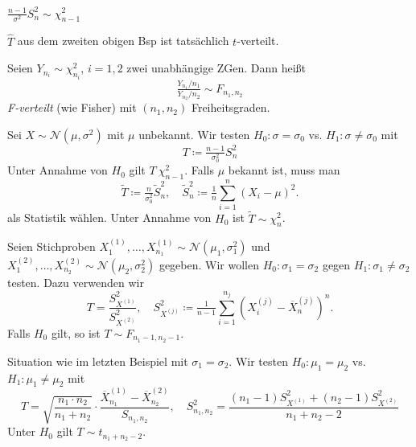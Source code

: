 \documentclass{cheat-sheet}
\newcommand{\Normal}{\mathcal{N}} %
\begin{document}
\begin{lem}
  $\tfrac{n-1}{\sigma^2} S_n^2 \sim \chi_{n-1}^2$
\end{lem}

\begin{kor}
  $\hat{T}$ aus dem zweiten obigen Bsp ist tatsächlich $t$-verteilt.
\end{kor}

\begin{defn}
  Seien $Y_{n_i} \sim \chi_{n_i}^2$, $i = 1, 2$ zwei unabhängige ZGen.
  Dann heißt %
  \[ \tfrac{Y_{n_1} / n_1}{Y_{n_2} / n_2} \sim F_{n_1, n_2} \]
  \emph{F-verteilt} (wie Fisher) mit $(n_1, n_2)$ Freiheitsgraden.
\end{defn}


\begin{bsp}
  Sei $X \sim \Normal(\mu, \sigma^2)$ mit $\mu$ unbekannt.
  Wir testen $H_0 : \sigma = \sigma_0$ vs. $H_1 : \sigma \neq \sigma_0$ mit
  \[ T \coloneqq \tfrac{n-1}{\sigma_0^2} S_n^2 \]
  Unter Annahme von $H_0$ gilt $T ~ \chi_{n-1}^2$.
  Falls $\mu$ bekannt ist, muss man
  \[
    \widetilde{T} \coloneqq \tfrac{n}{\sigma_0^2} \widetilde{S}_n^2, \quad
    \widetilde{S}_n^2 \coloneqq \tfrac{1}{n} \sum_{i=1}^n (X_i - \mu)^2.
  \]
  als Statistik wählen. Unter Annahme von $H_0$ ist $\widetilde{T} \sim \chi_n^2$.
\end{bsp}

\begin{bsp}
  Seien Stichproben $X_1^{(1)}, \ldots, X_{n_1}^{(1)} \sim \Normal(\mu_1, \sigma_1^2)$ und $X_1^{(2)}, \ldots, X_{n_2}^{(2)} \sim \Normal(\mu_2, \sigma_2^2)$ gegeben.
  Wir wollen $H_0 : \sigma_1 = \sigma_2$ gegen $H_1 : \sigma_1 \neq \sigma_2$ testen.
  Dazu verwenden wir
  \[
    T = \frac{S_{X^{(1)}}^2}{S_{X^{(2)}}^2}, \quad
    S_{X^{(j)}}^2 \coloneqq \tfrac{1}{n-1} \sum_{i=1}^{n_j} \left( X_i^{(j)} - \overline{X}^{(j)}_n \right)^n.
  \]
  Falls $H_0$ gilt, so ist $T \sim F_{n_1-1,n_2-1}$.
\end{bsp}

\begin{bsp}
  Situation wie im letzten Beispiel mit $\sigma_1 = \sigma_2$.
  Wir testen $H_0 : \mu_1 = \mu_2$ vs. $H_1 : \mu_1 \neq \mu_2$ mit
  \[
    T = \sqrt{\frac{n_1 \cdot n_2}{n_1 + n_2}} \cdot \frac{\overline{X}_{n_1}^{(1)} - \overline{X}_{n_2}^{(2)}}{S_{n_1,n_2}}, \quad
    S_{n_1,n_2}^2 = \frac{(n_1{-}1) S_{X^{(1)}}^2 + (n_2{-}1) S_{X^{(2)}}^2}{n_1 + n_2 - 2}
  \]
  Unter $H_0$ gilt $T \sim t_{n_1 + n_2 - 2}$.
\end{bsp}
\end{document}
